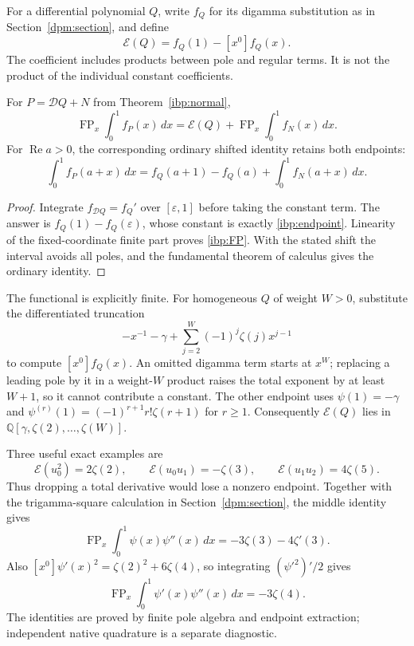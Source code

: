 For a differential polynomial $Q$, write $f_Q$ for its digamma
substitution as in Section~\ref{dpm:section}, and define
\begin{equation}\label{ibp:endpoint}
 \mathcal E(Q)=f_Q(1)-[x^0]f_Q(x).
\end{equation}
The coefficient includes products between pole and regular terms.
It is not the product of the individual constant coefficients.

\begin{corollary}
\label{ibp:integral}
For $P=\mathcal DQ+N$ from Theorem~\ref{ibp:normal},
\begin{equation}\label{ibp:FP}
 \operatorname{FP}_x\int_0^1 f_P(x)\,dx
       =\mathcal E(Q)+\operatorname{FP}_x\int_0^1f_N(x)\,dx.
\end{equation}
For $\operatorname{Re}a>0$, the corresponding ordinary shifted
identity retains both endpoints:
\[
 \int_0^1 f_P(a+x)\,dx
  =f_Q(a+1)-f_Q(a)+\int_0^1 f_N(a+x)\,dx.
\]
\end{corollary}

\begin{proof}
Integrate $f_{\mathcal DQ}=f_Q'$ over $[\varepsilon,1]$ before
taking the constant term.  The answer is $f_Q(1)-f_Q(\varepsilon)$,
whose constant is exactly \eqref{ibp:endpoint}.  Linearity of the
fixed-coordinate finite part proves \eqref{ibp:FP}.  With the stated
shift the interval avoids all poles, and the fundamental theorem of
calculus gives the ordinary identity.
\end{proof}

The functional is explicitly finite.  For homogeneous $Q$ of weight
$W>0$, substitute the differentiated truncation
\[
 -x^{-1}-\gamma+\sum_{j=2}^{W}(-1)^j\zeta(j)x^{j-1}
\]
to compute $[x^0]f_Q(x)$.  An omitted digamma term starts at $x^W$;
replacing a leading pole by it in a weight-$W$ product raises the total
exponent by at least $W+1$, so it cannot contribute a constant.
The other endpoint uses
$\psi(1)=-\gamma$ and
$\psi^{(r)}(1)=(-1)^{r+1}r!\zeta(r+1)$ for $r\ge1$.
Consequently $\mathcal E(Q)$ lies in
$\mathbb Q[\gamma,\zeta(2),\ldots,\zeta(W)]$.

Three useful exact examples are
\[
 \mathcal E(u_0^2)=2\zeta(2),\qquad
 \mathcal E(u_0u_1)=-\zeta(3),\qquad
 \mathcal E(u_1u_2)=4\zeta(5).
\]
Thus dropping a total derivative would lose a nonzero endpoint.
Together with the trigamma-square calculation in
Section~\ref{dpm:section}, the middle identity gives
\begin{equation}\label{ibp:digamma-trigamma}
 \operatorname{FP}_x\int_0^1\psi(x)\psi''(x)\,dx
          =-3\zeta(3)-4\zeta'(3).
\end{equation}
Also $[x^0]\psi'(x)^2=\zeta(2)^2+6\zeta(4)$, so integrating
$(\psi'^2)'/2$ gives
\begin{equation}\label{ibp:trigamma-tetragamma}
 \operatorname{FP}_x\int_0^1\psi'(x)\psi''(x)\,dx=-3\zeta(4).
\end{equation}
The identities are proved by finite pole algebra and endpoint extraction;
independent native quadrature is a separate diagnostic.

